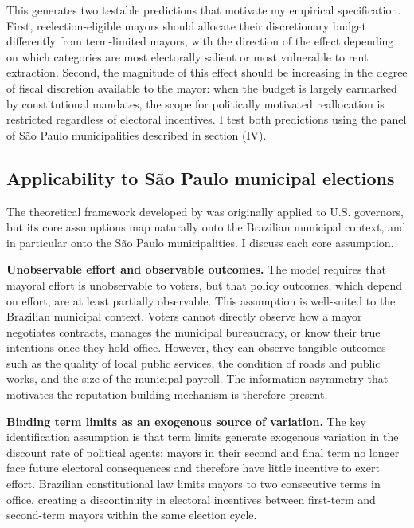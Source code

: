 \documentclass[12pt, a4paper]{article}
\begin{document}
This generates two testable predictions that motivate my empirical specification. First, reelection-eligible mayors should allocate their discretionary budget differently from term-limited mayors, with the direction of the effect depending on which categories are most electorally salient or most vulnerable to rent extraction. Second, the magnitude of this effect should be increasing in the degree of fiscal discretion available to the mayor: when the budget is largely earmarked by constitutional mandates, the scope for politically motivated reallocation is restricted regardless of electoral incentives. I test both predictions using the panel of São Paulo municipalities described in section (IV).

\subsection*{Applicability to São Paulo municipal elections}

The theoretical framework developed by  was originally applied to U.S. governors, but its core assumptions map naturally onto the Brazilian municipal context, and in particular onto the São Paulo municipalities. I discuss each core assumption.

\textbf{Unobservable effort and observable outcomes.} The model requires that mayoral effort is unobservable to voters, but that policy outcomes, which depend on effort, are at least partially observable. This assumption is well-suited to the Brazilian municipal context. Voters cannot directly observe how a mayor negotiates contracts, manages the municipal bureaucracy, or know their true intentions once they hold office. However, they can observe tangible outcomes such as the quality of local public services, the condition of roads and public works, and the size of the municipal payroll. The information asymmetry that motivates the reputation-building mechanism is therefore present.

\textbf{Binding term limits as an exogenous source of variation.} The key identification assumption is that term limits generate exogenous variation in the discount rate of political agents: mayors in their second and final term no longer face future electoral consequences and therefore have little incentive to exert effort. Brazilian constitutional law limits mayors to two consecutive terms in office, creating a discontinuity in electoral incentives between first-term and second-term mayors within the same election cycle.
\end{document}
